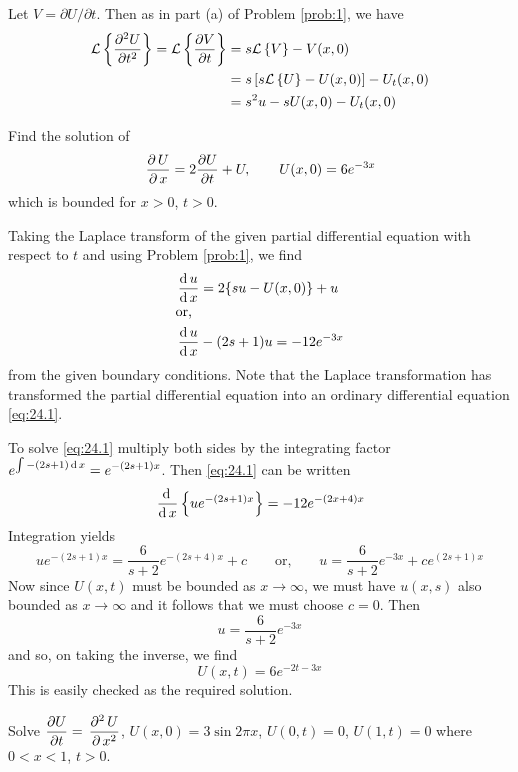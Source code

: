 \documentclass[../main-sheet.tex]{subfiles}
\begin{document}
\begin{soln}
    Let $ V=\partial U/\partial t $. Then as in part (a) of Problem \ref{prob:1}, we have
    \begin{align*}
        \mathcal{L}\left\{ \frac{\partial^2 U}{\partial t^2}\right\}=\mathcal{L}\left\{ \frac{\partial V}{\partial t}\right\}&=s\mathcal{L}\left\{ V\right\}-V(x,0)\\
        &=s\left[s\mathcal{L}\left\{ U\right\}-U(x,0)\right]-U_t(x,0)\\
        &=s^2 u-sU(x,0)-U_t(x,0)
    \end{align*}
\end{soln}
\begin{prob}
    Find the solution of 
    \[
        \,\frac{\partial\, U}{\partial\, x}=2\frac{\partial U}{\partial t}+U,\qquad U(x,0)=6e^{-3x}
    \]
    which is bounded for $ x>0 $, $ t>0 $.
\end{prob}
\begin{soln}
    Taking the Laplace transform of the given partial differential equation with respect to $ t $ and using Problem \ref{prob:1}, we find
    \begin{align}
        \,\frac{\mathrm{d}\,u}{\mathrm{d}\,x}&=2\{su-U(x,0)\}+u\notag\\
        \intertext{or, }
        \,\frac{\mathrm{d}\,u}{\mathrm{d}\,x}&-(2s+1)u=-12e^{-3x}\label{eq:24.1}
    \end{align}
    from the given boundary conditions. Note that the Laplace transformation has transformed the partial differential equation into an ordinary differential equation \eqref{eq:24.1}.

    To solve \eqref{eq:24.1} multiply both sides by the integrating factor $ \displaystyle e^{\int -(2s+1)\,\mathrm{d}\, x }=e^{-(2s+1)x } $. Then \eqref{eq:24.1} can be written 
    \[
        \,\frac{\mathrm{d}\,}{\mathrm{d}\,x}\left\{ u e^{-(2s+1)x} \right\}=-12 e^{-(2x+4)x}
    \]
    Integration yields
    \[
        ue^{-(2s+1)x}=\frac{6}{s+2}e^{-(2s+4)x}+c\qquad\text{or,}\qquad u=\frac{6}{s+2}e^{-3x}+ce^{(2s+1)x}
    \]
    Now since $ U(x,t) $ must be bounded as $ x\to \infty $, we must have $ u(x,s) $ also bounded as $ x\to\infty $ and it follows that we must choose $ c=0 $. Then 
    \[
        u=\frac{6}{s+2}e^{-3x}
    \]
    and so, on taking the inverse, we find
    \[
        U(x,t)=6e^{-2t-3x}
    \]
    This is easily checked as the required solution.
\end{soln}
\newpage
\begin{prob}
    Solve $ \displaystyle \frac{\partial U}{\partial t}=\,\frac{\partial^{2}\, U}{\partial\, x^{2}} $, $ U(x,0)=3\sin 2\pi x $, $ U(0,t)=0 $, $ U(1,t)=0 $ where $ 0<x<1 $, $ t>0 $.
\end{prob}
\end{document}
